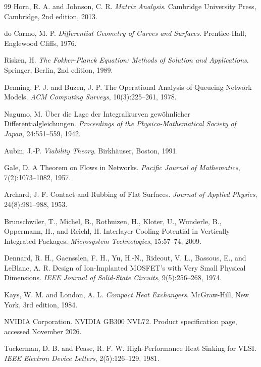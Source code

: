 \documentclass[11pt,openany]{book}
\theoremstyle{plain}
\theoremstyle{definition}
\theoremstyle{remark}
\begin{document}
\begin{thebibliography}{99}
Horn, R. A. and Johnson, C. R.
\newblock \emph{Matrix Analysis}.
\newblock Cambridge University Press, Cambridge, 2nd edition, 2013.

do Carmo, M. P.
\newblock \emph{Differential Geometry of Curves and Surfaces}.
\newblock Prentice-Hall, Englewood Cliffs, 1976.

Risken, H.
\newblock \emph{The Fokker-Planck Equation: Methods of Solution and Applications}.
\newblock Springer, Berlin, 2nd edition, 1989.

Denning, P. J. and Buzen, J. P.
\newblock The Operational Analysis of Queueing Network Models.
\newblock \emph{ACM Computing Surveys}, 10(3):225--261, 1978.

Nagumo, M.
\newblock \"Uber die Lage der Integralkurven gew\"ohnlicher Differentialgleichungen.
\newblock \emph{Proceedings of the Physico-Mathematical Society of Japan}, 24:551--559, 1942.

Aubin, J.-P.
\newblock \emph{Viability Theory}.
\newblock Birkh\"auser, Boston, 1991.

Gale, D.
\newblock A Theorem on Flows in Networks.
\newblock \emph{Pacific Journal of Mathematics}, 7(2):1073--1082, 1957.

Archard, J. F.
\newblock Contact and Rubbing of Flat Surfaces.
\newblock \emph{Journal of Applied Physics}, 24(8):981--988, 1953.

Brunschwiler, T., Michel, B., Rothuizen, H., Kloter, U., Wunderle, B., Oppermann, H., and Reichl, H.
\newblock Interlayer Cooling Potential in Vertically Integrated Packages.
\newblock \emph{Microsystem Technologies}, 15:57--74, 2009.

Dennard, R. H., Gaensslen, F. H., Yu, H.-N., Rideout, V. L., Bassous, E., and LeBlanc, A. R.
\newblock Design of Ion-Implanted MOSFET's with Very Small Physical Dimensions.
\newblock \emph{IEEE Journal of Solid-State Circuits}, 9(5):256--268, 1974.

Kays, W. M. and London, A. L.
\newblock \emph{Compact Heat Exchangers}.
\newblock McGraw-Hill, New York, 3rd edition, 1984.

NVIDIA Corporation.
\newblock NVIDIA GB300 NVL72.
\newblock Product specification page, accessed November 2026.

Tuckerman, D. B. and Pease, R. F. W.
\newblock High-Performance Heat Sinking for VLSI.
\newblock \emph{IEEE Electron Device Letters}, 2(5):126--129, 1981.


\end{thebibliography}
\end{document}
